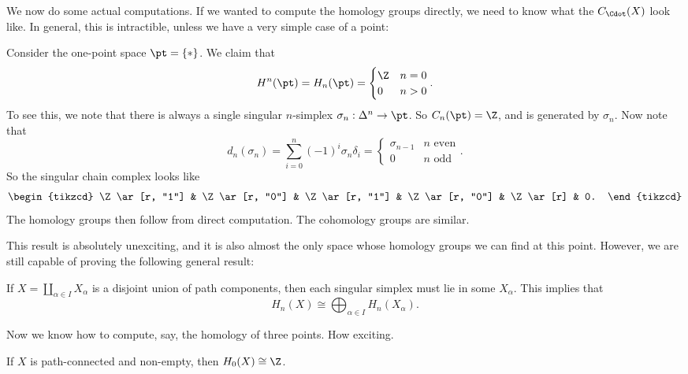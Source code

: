 \documentclass[a4paper]{article}
\begin{document}
We now do some actual computations. If we wanted to compute the homology groups directly, we need to know what the $C_\Cdot(X)$ look like. In general, this is intractible, unless we have a very simple case of a point:
\begin{eg}
  Consider the one-point space $\pt = \{*\}$. We claim that
  \[
    H^n(\pt) = H_n(\pt) =
    \begin{cases}
      \Z & n = 0\\
      0 & n > 0
    \end{cases}.
  \]
  To see this, we note that there is always a single singular $n$-simplex $\sigma_n: \Delta^n \to \pt$. So $C_n(\pt) = \Z$, and is generated by $\sigma_n$. Now note that
  \[
    d_n(\sigma_n) = \sum_{i = 0}^n (-1)^i \sigma_n \delta_i =
    \begin{cases}
      \sigma_{n - 1} & n\text{ even}\\
      0 & n\text{ odd}
    \end{cases}.
  \]
  So the singular chain complex looks like
  \[
    \begin{tikzcd}
      \Z \ar[r, "1"] & \Z\ar[r, "0"] & \Z \ar[r, "1"] & \Z \ar[r, "0"] & \Z \ar[r] & 0.
    \end{tikzcd}
  \]
  The homology groups then follow from direct computation. The cohomology groups are similar.
\end{eg}
This result is absolutely unexciting, and it is also almost the only space whose homology groups we can find at this point. However, we are still capable of proving the following general result:

\begin{eg}
  If $X = \coprod_{\alpha \in I} X_\alpha$ is a disjoint union of path components, then each singular simplex must lie in some $X_\alpha$. This implies that
  \[
    H_n(X) \cong \bigoplus_{\alpha \in I} H_n(X_\alpha).
  \]
\end{eg}
Now we know how to compute, say, the homology of three points. How exciting.

\begin{lemma}
  If $X$ is path-connected and non-empty, then $H_0(X) \cong \Z$.
\end{lemma}
\end{document}
